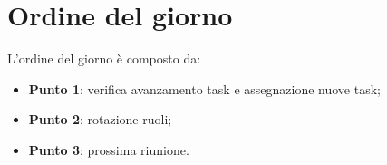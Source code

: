 \section{Ordine del giorno}
L'ordine del giorno è composto da:
\begin{itemize}
	\item \textbf{Punto 1}: verifica avanzamento task e assegnazione nuove task;
	\item \textbf{Punto 2}: rotazione ruoli;
	\item \textbf{Punto 3}: prossima riunione.
\end{itemize}


